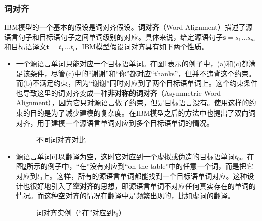 
\subsubsection{词对齐}

\parinterval IBM模型的一个基本的假设是词对齐假设。{\small\sffamily\bfseries{词对齐}}（Word Alignment）描述了源语言句子和目标语句子之间单词级别的对应。具体来说，给定源语句子$\mathbf{s}=s_1...s_m$和目标语译文$\mathbf{t}=t_1...t_l$，IBM模型假设词对齐具有如下两个性质。

\begin{itemize}
\vspace{0.5em}
\item 一个源语言单词只能对应一个目标语单词。在图\ref{fig:3-15}表示的例子中，(a)和(c)都满足该条件，尽管(c)中的``谢谢''和``你''都对应``thanks''，但并不违背这个约束。而(b)不满足约束，因为``谢谢''同时对应到了两个目标语单词上。这个约束条件也导致这里的词对齐变成一种{\small\sffamily\bfseries{非对称的词对齐}}（Asymmetric Word Alignment），因为它只对源语言做了约束，但是目标语言没有。使用这样的约束的目的是为了减少建模的复杂度。在IBM模型之后的方法中也提出了双向词对齐，用于建模一个源语言单词对应到多个目标语单词的情况。

\begin{figure}[htp]
    \centering

    \caption{不同词对齐对比}
    \label{fig:3-15}
\end{figure}

\vspace{0.5em}
\item 源语言单词可以翻译为空，这时它对应到一个虚拟或伪造的目标语单词$t_0$。在图\ref{fig:3-16}所示的例子中，``在''没有对应到``on the table''中的任意一个词，而是把它对应到$t_0$上。这样，所有的源语言单词都能找到一个目标语单词对应。这种设计也很好地引入了{\small\sffamily\bfseries{空对齐}}的思想，即源语言单词不对应任何真实存在的单词的情况。而这种空对齐的情况在翻译中是频繁出现的，比如虚词的翻译。

\begin{figure}[htp]
    \centering

    \caption{词对齐实例（``在''对应到$t_0$）}
    \label{fig:3-16}
\end{figure}
\vspace{0.5em}
\end{itemize}

